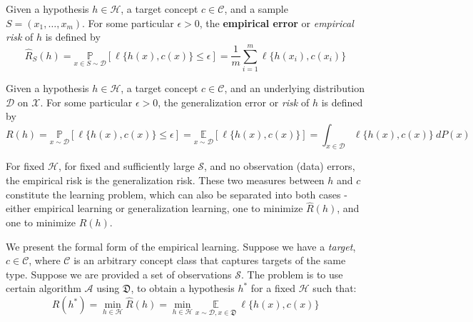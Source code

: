 \begin{definition}
    Given a hypothesis $h\in \mathcal{H}$, a target concept $c\in \mathcal{C}$, and a sample $S=(x_{1},\dots,x_{m})$. For some particular $\epsilon>0$, the \textbf{empirical error} or \textit{empirical risk} of $h$ is defined by\begin{equation}
        \hat{R}_{S}(h) = \underset{x\in S\sim\mathcal{D}}{\mathbb{P}} [\ell\{h(x),c(x)\}\leq \epsilon] =\frac{1}{m} \sum_{i=1}^{m} \ell\{h(x_i),c(x_i)\}
    \end{equation}
\end{definition}

\begin{definition}
    Given a hypothesis $h\in\mathcal{H}$, a target concept $c\in\mathcal{C}$, and an underlying distribution $\mathcal{D}$ on $\mathcal{X}$. For some particular $\epsilon>0$, the generalization error or \textit{risk} of $h$ is defined by
    \begin{equation}
        R(h) = \underset{x\sim\mathcal{D}}{\mathbb{P}} [\ell\{h(x),c(x)\}\leq \epsilon] = \underset{x\sim\mathcal{D}}{\mathbb{E}}[\ell\{h(x),c(x)\}] = \int_{x\in \mathcal{D}} \ell\{h(x),c(x)\} \: dP(x)
    \end{equation}
\end{definition}
For fixed $\mathcal{H}$, for fixed and sufficiently large $\mathcal{S}$, and no observation (data) errors, the empirical risk is the generalization risk. These two measures between $h$ and $c$ constitute the learning problem, which can also be separated into both cases - either empirical learning or generalization learning, one to minimize $\hat{R}(h)$, and one to minimize $R(h)$. 

\begin{definition}
    We present the formal form of the empirical learning. Suppose we have a \textit{target}, $c\in\mathcal{C}$, where $\mathcal{C}$ is an arbitrary concept class that captures targets of the same type. Suppose we are provided a set of observations $\mathcal{S}$. The problem is to use certain algorithm $\mathcal{A}$ using $\mathfrak{D}$, to obtain a hypothesis $h^{*}$ for a fixed $\mathcal{H}$ such that: 
    \begin{equation}\label{eq:lp12}
        R(h^{*}) = \min_{h\in\mathcal{H}} \hat{R}(h) = \min_{h\in\mathcal{H}} \underset{x\sim\mathcal{D}, x\in \mathfrak{D}}{\mathbb{E}}\:\ell\{h(x),c(x)\}
    \end{equation} 
\end{definition}

